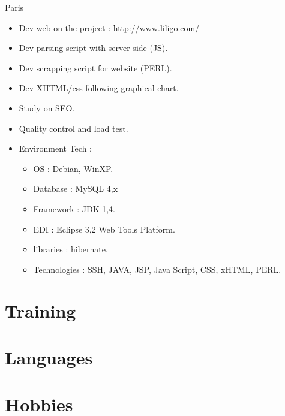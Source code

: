 \documentclass[10pt,a4paper,sans]{moderncv}
\begin{document}
\vskip 1cm
{Paris}{
  \begin{itemize}%
    \item Dev web on the project : http://www.liligo.com/
    \item Dev parsing script with server-side (JS).
    \item Dev scrapping script for website (PERL).
    \item Dev XHTML/css following graphical chart.
    \item Study on SEO.
    \item Quality control and load test.
    \item Environment Tech :
      \begin{itemize}%
        \item OS : Debian, WinXP.
        \item Database : MySQL 4,x
        \item Framework : JDK 1,4.
        \item EDI : Eclipse 3,2 Web Tools Platform.
        \item libraries : hibernate.
        \item Technologies : SSH, JAVA, JSP, Java Script, CSS, xHTML, PERL.
      \end{itemize}
  \end{itemize}}

\vskip 1cm

\section{Training}

\section{Languages}

\section{Hobbies}

\clearpage
\end{document}
